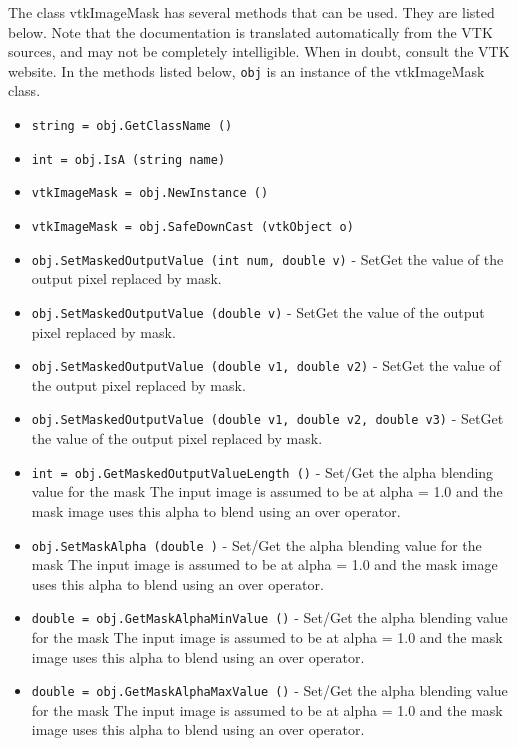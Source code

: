 The class vtkImageMask has several methods that can be used.
  They are listed below.
Note that the documentation is translated automatically from the VTK sources,
and may not be completely intelligible.  When in doubt, consult the VTK website.
In the methods listed below, \verb|obj| is an instance of the vtkImageMask class.
\begin{itemize}
\item  \verb|string = obj.GetClassName ()|

\item  \verb|int = obj.IsA (string name)|

\item  \verb|vtkImageMask = obj.NewInstance ()|

\item  \verb|vtkImageMask = obj.SafeDownCast (vtkObject o)|

\item  \verb|obj.SetMaskedOutputValue (int num, double v)| -  SetGet the value of the output pixel replaced by mask.

\item  \verb|obj.SetMaskedOutputValue (double v)| -  SetGet the value of the output pixel replaced by mask.

\item  \verb|obj.SetMaskedOutputValue (double v1, double v2)| -  SetGet the value of the output pixel replaced by mask.

\item  \verb|obj.SetMaskedOutputValue (double v1, double v2, double v3)| -  SetGet the value of the output pixel replaced by mask.

\item  \verb|int = obj.GetMaskedOutputValueLength ()| -  Set/Get the alpha blending value for the mask
 The input image is assumed to be at alpha = 1.0
 and the mask image uses this alpha to blend using
 an over operator.

\item  \verb|obj.SetMaskAlpha (double )| -  Set/Get the alpha blending value for the mask
 The input image is assumed to be at alpha = 1.0
 and the mask image uses this alpha to blend using
 an over operator.

\item  \verb|double = obj.GetMaskAlphaMinValue ()| -  Set/Get the alpha blending value for the mask
 The input image is assumed to be at alpha = 1.0
 and the mask image uses this alpha to blend using
 an over operator.

\item  \verb|double = obj.GetMaskAlphaMaxValue ()| -  Set/Get the alpha blending value for the mask
 The input image is assumed to be at alpha = 1.0
 and the mask image uses this alpha to blend using
 an over operator.


\end{itemize}
